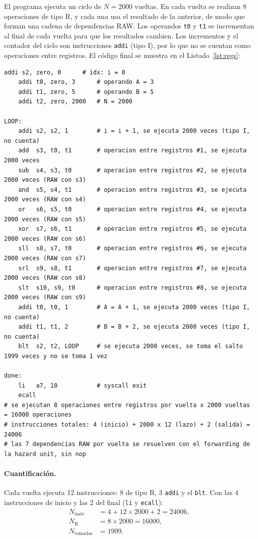 \documentclass[11pt,a4paper]{article}
\begin{document}
El programa ejecuta un ciclo de $N=2000$ vueltas. En cada vuelta se realizan
8 operaciones de tipo R, y cada una usa el resultado de la anterior, de modo que
forman una cadena de dependencias RAW. Los operandos \texttt{t0} y \texttt{t1} se
incrementan al final de cada vuelta para que los resultados cambien. Los
incrementos y el contador del ciclo son instrucciones \texttt{addi} (tipo I), por
lo que no se cuentan como operaciones entre registros. El c\'odigo final se muestra en el
Listado~\ref{lst:regs}:

\begin{lstlisting}[style=asm,caption={Programa de operaciones entre registros (versi\'on para el procesador con hazard unit).},label={lst:regs}]
    addi s2, zero, 0      # idx: i = 0
    addi t0, zero, 3      # operando A = 3
    addi t1, zero, 5      # operando B = 5
    addi t2, zero, 2000   # N = 2000

LOOP:
    addi s2, s2, 1        # i = i + 1, se ejecuta 2000 veces (tipo I, no cuenta)
    add  s3, t0, t1       # operacion entre registros #1, se ejecuta 2000 veces
    sub  s4, s3, t0       # operacion entre registros #2, se ejecuta 2000 veces (RAW con s3)
    and  s5, s4, t1       # operacion entre registros #3, se ejecuta 2000 veces (RAW con s4)
    or   s6, s5, t0       # operacion entre registros #4, se ejecuta 2000 veces (RAW con s5)
    xor  s7, s6, t1       # operacion entre registros #5, se ejecuta 2000 veces (RAW con s6)
    sll  s8, s7, t0       # operacion entre registros #6, se ejecuta 2000 veces (RAW con s7)
    srl  s9, s8, t1       # operacion entre registros #7, se ejecuta 2000 veces (RAW con s8)
    slt  s10, s9, t0      # operacion entre registros #8, se ejecuta 2000 veces (RAW con s9)
    addi t0, t0, 1        # A = A + 1, se ejecuta 2000 veces (tipo I, no cuenta)
    addi t1, t1, 2        # B = B + 2, se ejecuta 2000 veces (tipo I, no cuenta)
    blt  s2, t2, LOOP     # se ejecuta 2000 veces, se toma el salto 1999 veces y no se toma 1 vez

done:
    li   a7, 10           # syscall exit
    ecall
# se ejecutan 8 operaciones entre registros por vuelta x 2000 vueltas = 16000 operaciones
# instrucciones totales: 4 (inicio) + 2000 x 12 (lazo) + 2 (salida) = 24006
# las 7 dependencias RAW por vuelta se resuelven con el forwarding de la hazard unit, sin nop
\end{lstlisting}

\paragraph{Cuantificaci\'on.}
Cada vuelta ejecuta 12 instrucciones: 8 de tipo R, 3 \texttt{addi} y el
\texttt{blt}. Con las 4 instrucciones de inicio y las 2 del final (\texttt{li} y
\texttt{ecall}):
\begin{align}
  N_{\text{instr}} &= 4 + 12 \times 2000 + 2 = 24006, \\
  N_{\text{R}} &= 8 \times 2000 = 16000, \\
  N_{\text{tomados}} &= 1999 .
\end{align}
\end{document}
